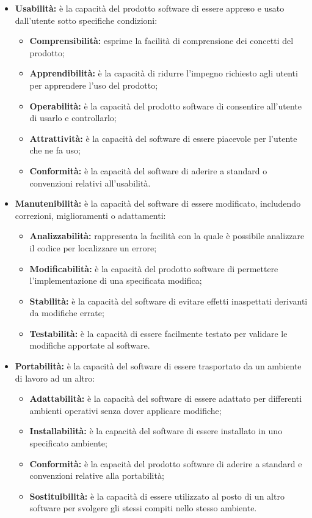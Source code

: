 \begin{itemize}
\item \textbf{Usabilità:} è la capacità del prodotto software di essere appreso e usato dall'utente sotto specifiche condizioni:
\begin{itemize}
	\item \textbf{Comprensibilità:} esprime la facilità di comprensione dei concetti del prodotto;
	\item \textbf{Apprendibilità:} è la capacità di ridurre l'impegno richiesto agli utenti per apprendere l'uso del prodotto;
	\item \textbf{Operabilità:} è la capacità del prodotto software di consentire all'utente di usarlo e controllarlo;
	\item \textbf{Attrattività:} è la capacità del software di essere piacevole per l'utente che ne fa uso;
	\item \textbf{Conformità:} è la capacità del software di aderire a standard o convenzioni relativi all'usabilità.
\end{itemize}
\item \textbf{Manutenibilità:} è la capacità del software di essere modificato, includendo correzioni, miglioramenti o adattamenti:
\begin{itemize}
	\item \textbf{Analizzabilità:} rappresenta la facilità con la quale è possibile analizzare il codice per localizzare un errore;
	\item \textbf{Modificabilità:} è la capacità del prodotto software di permettere l'implementazione di una specificata modifica;
	\item \textbf{Stabilità:} è la capacità del software di evitare effetti inaspettati derivanti da modifiche errate;
	\item \textbf{Testabilità:} è la capacità di essere facilmente testato per validare le modifiche apportate al software.
\end{itemize}

\item \textbf{Portabilità:} è la capacità del software di essere trasportato da un ambiente di lavoro ad un altro:
\begin{itemize}
	\item \textbf{Adattabilità:} è la capacità del software di essere adattato per differenti ambienti operativi senza dover applicare modifiche;
	\item \textbf{Installabilità:} è la capacità del software di essere installato in uno specificato ambiente;
	\item \textbf{Conformità:} è la capacità del prodotto software di aderire a standard e convenzioni relative alla portabilità;
	\item \textbf{Sostituibilità:} è la capacità di essere utilizzato al posto di un altro software per svolgere gli stessi compiti nello stesso ambiente.
\end{itemize}

\end{itemize}


